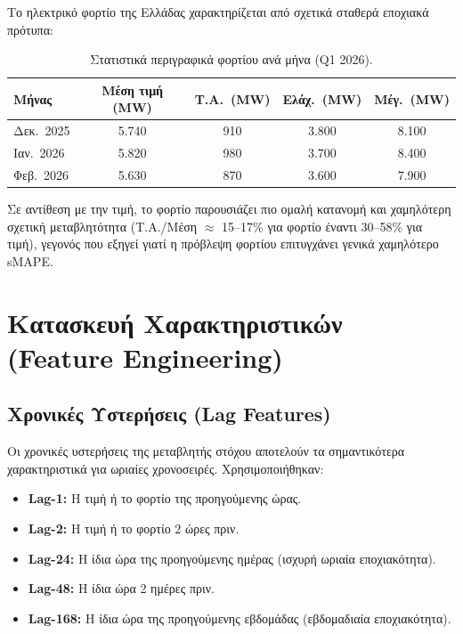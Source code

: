 Το ηλεκτρικό φορτίο της Ελλάδας χαρακτηρίζεται από σχετικά σταθερά εποχιακά πρότυπα:

\begin{table}[H]
\centering
\caption{Στατιστικά περιγραφικά φορτίου ανά μήνα (Q1 2026).}
\label{tab:load_stats}
\begin{tabular}{lcccc}
\toprule
\textbf{Μήνας} & \textbf{Μέση τιμή (MW)} & \textbf{Τ.Α.\ (MW)} & \textbf{Ελάχ.\ (MW)} & \textbf{Μέγ.\ (MW)} \\
\midrule
Δεκ.\ 2025 & 5.740 & 910 & 3.800 & 8.100 \\
Ιαν.\ 2026 & 5.820 & 980 & 3.700 & 8.400 \\
Φεβ.\ 2026 & 5.630 & 870 & 3.600 & 7.900 \\
\bottomrule
\end{tabular}
\end{table}

Σε αντίθεση με την τιμή, το φορτίο παρουσιάζει πιο ομαλή κατανομή και χαμηλότερη σχετική
μεταβλητότητα (Τ.Α./Μέση $\approx$ 15--17\% για φορτίο έναντι 30--58\% για τιμή), γεγονός που
εξηγεί γιατί η πρόβλεψη φορτίου επιτυγχάνει γενικά χαμηλότερο sMAPE.


\section{Κατασκευή Χαρακτηριστικών (Feature Engineering)}
\label{sec:features}

\subsection{Χρονικές Υστερήσεις (Lag Features)}

Οι χρονικές υστερήσεις της μεταβλητής στόχου αποτελούν τα σημαντικότερα χαρακτηριστικά για
ωριαίες χρονοσειρές. Χρησιμοποιήθηκαν:

\begin{itemize}
    \item \textbf{Lag-1:} Η τιμή ή το φορτίο της προηγούμενης ώρας.
    \item \textbf{Lag-2:} Η τιμή ή το φορτίο 2 ώρες πριν.
    \item \textbf{Lag-24:} Η ίδια ώρα της προηγούμενης ημέρας (ισχυρή ωριαία εποχιακότητα).
    \item \textbf{Lag-48:} Η ίδια ώρα 2 ημέρες πριν.
    \item \textbf{Lag-168:} Η ίδια ώρα της προηγούμενης εβδομάδας (εβδομαδιαία εποχιακότητα).
\end{itemize}

